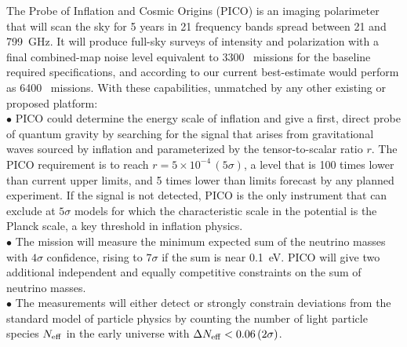 \documentclass[PICOAPC.tex]{subfiles}
\begin{document}
The Probe of Inflation and Cosmic Origins (PICO) is an imaging polarimeter that will scan the sky for 5 years in 21 frequency bands spread between 21 and 799~GHz.
It will produce full-sky surveys of intensity and polarization with a final combined-map noise level equivalent to 3300 \planck\ missions for the baseline required specifications, and according to our current best-estimate 
would perform as 6400 \planck\ missions. With these capabilities, unmatched by any other existing or proposed platform: \\
$\bullet$ PICO could determine the energy scale of inflation and give a first, direct probe of quantum gravity by searching for the signal that arises from gravitational waves sourced by inflation and parameterized by the tensor-to-scalar ratio $r$. The PICO requirement is to reach $r =5\times10^{-4} \, (5\sigma)$, a level that is 100 times lower than current upper limits, and 5 times lower than limits forecast by any planned experiment.  If the signal is not detected, PICO is the only instrument that can exclude at $5 \sigma$ models for which the characteristic scale in the potential is the Planck scale, a key threshold in inflation physics. \\ %
$\bullet$ The mission will measure the minimum expected sum of the neutrino masses with $4\sigma$ confidence, rising to $7\sigma$ if the sum is near 0.1~eV. 
PICO will give two additional independent and equally competitive constraints on the sum of neutrino masses. \\
$\bullet$ The measurements will either detect or strongly constrain deviations from the standard model of particle physics by counting the number of light particle species $N_{\rm eff}$ in the early universe with $\Delta N_{\rm eff} < 0.06 \, (2\sigma)$.  \\
\end{document}
